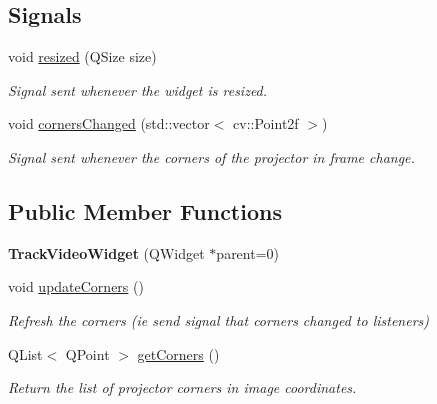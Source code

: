 \subsection*{Signals}
\begin{DoxyCompactItemize}
\item 
void \hyperlink{classTrackVideoWidget_ac93883c02ed389d1d190f1206481a7f9}{resized} (Q\+Size size)\hypertarget{classTrackVideoWidget_ac93883c02ed389d1d190f1206481a7f9}{}\label{classTrackVideoWidget_ac93883c02ed389d1d190f1206481a7f9}

\begin{DoxyCompactList}\small\item\em Signal sent whenever the widget is resized. \end{DoxyCompactList}\item 
void \hyperlink{classTrackVideoWidget_a5ba54b89296e93fd746c5534dd5fd213}{corners\+Changed} (std\+::vector$<$ cv\+::\+Point2f $>$)\hypertarget{classTrackVideoWidget_a5ba54b89296e93fd746c5534dd5fd213}{}\label{classTrackVideoWidget_a5ba54b89296e93fd746c5534dd5fd213}

\begin{DoxyCompactList}\small\item\em Signal sent whenever the corners of the projector in frame change. \end{DoxyCompactList}\end{DoxyCompactItemize}
\subsection*{Public Member Functions}
\begin{DoxyCompactItemize}
\item 
{\bfseries Track\+Video\+Widget} (Q\+Widget $\ast$parent=0)\hypertarget{classTrackVideoWidget_aa0938998c151b1771b7129e58e45a58b}{}\label{classTrackVideoWidget_aa0938998c151b1771b7129e58e45a58b}

\item 
void \hyperlink{classTrackVideoWidget_a9b9957ce76ae84e79ed41eb7d6673d1a}{update\+Corners} ()\hypertarget{classTrackVideoWidget_a9b9957ce76ae84e79ed41eb7d6673d1a}{}\label{classTrackVideoWidget_a9b9957ce76ae84e79ed41eb7d6673d1a}

\begin{DoxyCompactList}\small\item\em Refresh the corners (ie send signal that corners changed to listeners) \end{DoxyCompactList}\item 
Q\+List$<$ Q\+Point $>$ \hyperlink{classTrackVideoWidget_a2944ab20069028c72b9baddee727e51b}{get\+Corners} ()\hypertarget{classTrackVideoWidget_a2944ab20069028c72b9baddee727e51b}{}\label{classTrackVideoWidget_a2944ab20069028c72b9baddee727e51b}

\begin{DoxyCompactList}\small\item\em Return the list of projector corners in image coordinates. \end{DoxyCompactList}\end{DoxyCompactItemize}
